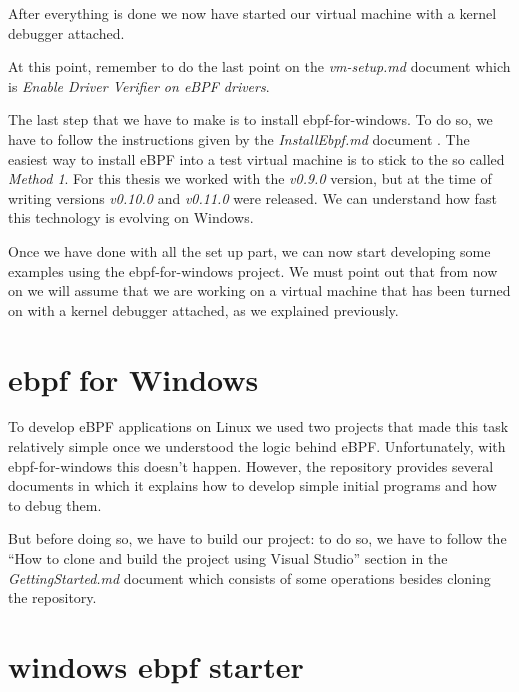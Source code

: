 After everything is done we now have started our virtual machine with a kernel debugger attached.

At this point, remember to do the last point on the \textit{vm-setup.md} document which is \textit{Enable Driver Verifier on eBPF drivers}.

The last step that we have to make is to install ebpf-for-windows.
To do so, we have to follow the instructions given by the \textit{InstallEbpf.md} document \cite{InseBPFDoc}.
The easiest way to install eBPF into a test virtual machine is to stick to the so called \textit{Method 1}.
For this thesis we worked with the \textit{v0.9.0} version, but at the time of writing versions \textit{v0.10.0} and \textit{v0.11.0} were released.
We can understand how fast this technology is evolving on Windows.

Once we have done with all the set up part, we can now start developing some examples using the ebpf-for-windows project.
We must point out that from now on we will assume that we are working on a virtual machine that has been turned on with a kernel debugger attached, as we explained previously.

\section{ebpf for Windows}



To develop eBPF applications on Linux we used two projects that made this task relatively simple once we understood the logic behind eBPF.
Unfortunately, with ebpf-for-windows this doesn't happen.
However, the repository provides several documents in which it explains how to develop simple initial programs and how to debug them.

But before doing so, we have to build our project: to do so, we have to follow the ``How to clone and build the project using Visual Studio'' section in the \textit{GettingStarted.md} document which consists of some operations besides cloning the repository.

\cite{TutDoc}

\cite{DebugDoc}

\section{windows ebpf starter}


